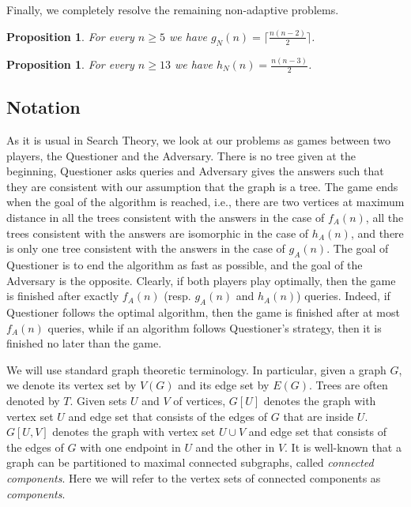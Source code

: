 \documentclass[12pt,a4paper]{amsart}
\theoremstyle{plain}
\newtheorem{proposition}[theorem]{Proposition}
\theoremstyle{definition}
\begin{document}
Finally, we completely resolve the remaining non-adaptive problems.

\begin{proposition}\label{nonaddet}
  For every $n\ge 5$ we have $g_N(n)=\lceil\frac{n(n-2)}{2}\rceil$.
\end{proposition}

\begin{proposition}\label{nonadiso}
    For every $n \geq 13$ we have $h_N(n)=\frac{n(n-3)}{2}$. 
\end{proposition}


\subsection{Notation} 

As it is usual in Search Theory, we look at our problems as games between two players, the Questioner and the Adversary. There is no tree given at the beginning, Questioner asks queries and Adversary gives the answers such that they are consistent with our assumption that the graph is a tree. The game ends when the goal of the algorithm is reached, i.e., there are two vertices at maximum distance in all the trees consistent with the answers in the case of $f_A(n)$, all the trees consistent with the answers are isomorphic in the case of $h_A(n)$, and there is only one tree consistent with the answers in the case of $g_A(n)$. The goal of Questioner is to end the algorithm as fast as possible, and the goal of the Adversary is the opposite. Clearly, if both players play optimally, then the game is finished after exactly $f_A(n)$ (resp. $g_A(n)$ and $h_A(n)$) queries. Indeed, if Questioner follows the optimal algorithm, then the game is finished after at most $f_A(n)$ queries, while if an algorithm follows Questioner's strategy, then it is finished no later than the game.

We will use standard graph theoretic terminology. In particular, given a graph $G$, we denote its vertex set by $V(G)$ and its edge set by $E(G)$. Trees are often denoted by $T$. Given sets $U$ and $V$ of vertices, $G[U]$ denotes the graph with vertex set $U$ and edge set that consists of the edges of $G$ that are inside $U$. $G[U,V]$ denotes the graph with vertex set $U\cup V$ and edge set that consists of the edges of $G$ with one endpoint in $U$ and the other in $V$. It is well-known that a graph can be partitioned to maximal connected subgraphs, called \textit{connected components}. Here we will refer to the vertex sets of connected components as \textit{components}.
\end{document}
